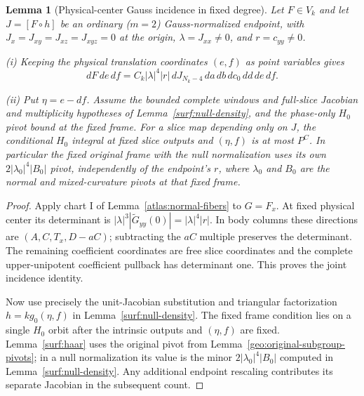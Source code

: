 \documentclass[11pt]{amsart}
\newtheorem{lemma}[theorem]{Lemma}
\theoremstyle{definition}
\theoremstyle{remark}
\numberwithin{equation}{section}
\begin{document}
\begin{lemma}[Physical-center Gauss incidence in fixed degree]\label{surf:physical-gauss-density}
Let $F\in V_k$ and let $J=[F\circ h]$ be an ordinary ($m=2$) Gauss-normalized endpoint, with $J_x=J_{xy}=J_{xz}=J_{xyz}=0$ at the origin, $\lambda=J_{xx}\ne0$, and $r=c_{yy}\ne0$.

\noindent\textup{(i)} Keeping the physical translation coordinates $(e,f)$ as point variables gives
\[
dF\,de\,df=C_k|\lambda|^4|r|\,dJ_{N_k-4}\,da\,db\,dc_0\,dd\,de\,df.
\]

\noindent\textup{(ii)} Put $\eta=e-df$. Assume the bounded complete windows and full-slice Jacobian and multiplicity hypotheses of Lemma~\ref{surf:null-density}, and the phase-only $H_0$ pivot bound at the fixed frame. For a slice map depending only on $J$, the conditional $H_0$ integral at fixed slice outputs and $(\eta,f)$ is at most $P^C$. In particular the fixed original frame with the null normalization uses its own $2|\lambda_0|^4|B_0|$ pivot, independently of the endpoint's $r$, where $\lambda_0$ and $B_0$ are the normal and mixed-curvature pivots at that fixed frame.
\end{lemma}
\begin{proof}
Apply chart I of Lemma~\ref{atlas:normal-fibers} to $G=F_x$. At fixed physical center its determinant is $|\lambda|^3|\widetilde G_{yy}(0)|=|\lambda|^4|r|$. In body columns these directions are $(A,C,T_x,D-aC)$; subtracting the $aC$ multiple preserves the determinant. The remaining coefficient coordinates are free slice coordinates and the complete upper-unipotent coefficient pullback has determinant one. This proves the joint incidence identity.

Now use precisely the unit-Jacobian substitution and triangular factorization $h=k g_0(\eta,f)$ in Lemma~\ref{surf:null-density}. The fixed frame condition lies on a single $H_0$ orbit after the intrinsic outputs and $(\eta,f)$ are fixed. Lemma~\ref{surf:haar} uses the original pivot from Lemma~\ref{geo:original-subgroup-pivots}; in a null normalization its value is the minor $2|\lambda_0|^4|B_0|$ computed in Lemma~\ref{surf:null-density}. Any additional endpoint rescaling contributes its separate Jacobian in the subsequent count.
\end{proof}
\end{document}
